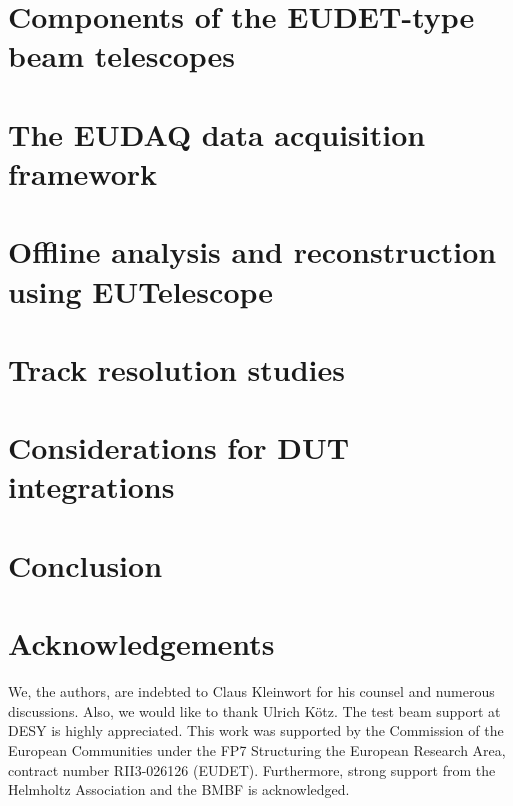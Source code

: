 \documentclass[a4paper,10pt]{scrartcl}
\begin{document}
\section{Components of the EUDET-type beam telescopes}
\label{sec:tscope}


\section{The EUDAQ data acquisition framework}
\label{sec:eudaq}


\section{Offline analysis and reconstruction using EUTelescope}
\label{sec:offline}


\section{Track resolution studies}
\label{sec:trackres}


\section{Considerations for DUT integrations}
\label{sec:dutintegration}


\section{Conclusion}
\label{sec:conclusion}



\section*{Acknowledgements}
We, the authors, are indebted to Claus Kleinwort for his counsel and numerous discussions. 
Also, we would like to thank Ulrich K\"otz.
The test beam support at DESY is highly appreciated. 
This work was supported by the Commission of the European Communities under the FP7 Structuring the European Research Area, contract number RII3-026126 (EUDET). 
Furthermore, strong support from the Helmholtz Association and the BMBF is acknowledged.

\small


\end{document}
